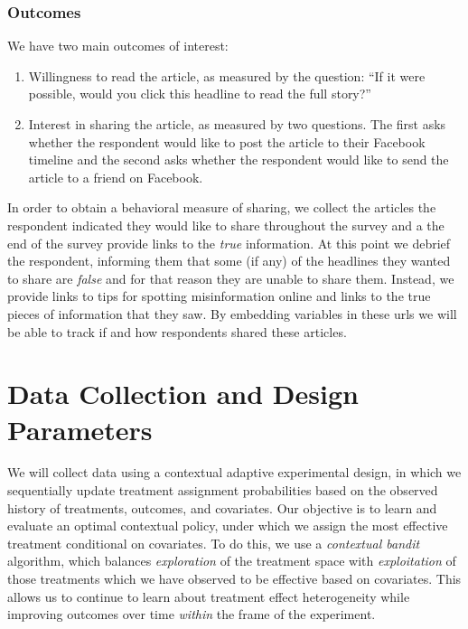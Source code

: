 \documentclass[letterpaper, 12pt, parskip=full,DIV=12]{scrartcl}
\begin{document}
\subsubsection{Outcomes}
We have two main outcomes of interest:

\begin{enumerate}
\item Willingness to read the article, as measured by the question: ``If it were possible, would you click this headline to read the full story?''
\item Interest in sharing the article, as measured by two questions. The first asks whether the respondent would like to post the article to their Facebook timeline and the second asks whether the respondent would like to send the article to a friend on Facebook. 
\end{enumerate}

In order to obtain a behavioral measure of sharing, we collect the articles the respondent indicated they would like to share throughout the survey and a the end of the survey provide links to the \textit{true} information. At this point we debrief the respondent, informing them that some (if any) of the headlines they wanted to share are \textit{false} and for that reason they are unable to share them. Instead, we provide links to tips for spotting misinformation online and links to the true pieces of information that they saw. By embedding variables in these urls we will be able to track if and how respondents shared these articles.




\section{Data Collection and Design Parameters}

We will collect data using a contextual adaptive experimental design, in which we sequentially update treatment assignment probabilities based on the observed history of treatments, outcomes, and covariates. Our objective is to learn and evaluate an optimal contextual policy, under which we assign the most effective treatment conditional on covariates. To do this, we use a \textit{contextual bandit} algorithm, which balances \textit{exploration} of the treatment space with \textit{exploitation} of those treatments which we have observed to be effective based on covariates.  This allows us to continue to learn about treatment effect heterogeneity while improving outcomes over time \textit{within} the frame of the experiment. 
\end{document}
